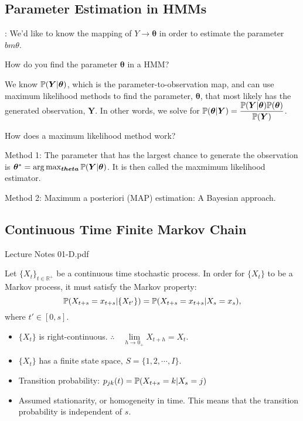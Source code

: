 \subsection{Parameter Estimation in HMMs}: We'd like to know the mapping of $Y \to \bm{\theta}$ in order to estimate the parameter $bm{\theta}$.
\begin{quest}
	\item How do you find the parameter $\bm{\theta}$ in a HMM?
	\begin{ans}
	We know $\mathbb{P}(\bm{Y}|\bm{\theta})$, which is the parameter-to-observation map, and can use maximum likelihood methods to find the parameter, $\bm{\theta}$, that most likely has the generated observation, $\bm{Y}$. In other words, we solve for $\mathbb{P}(\bm{\theta} | \bm{Y}) = \dfrac{\mathbb{P}(\bm{Y} | \bm{\theta}) \mathbb{P}(\bm{\theta}) }{ \mathbb{P}(\bm{Y}) } $.  
	\end{ans}
	
	\item How does a maximum likelihood method work?
	\begin{ans}
	Method 1: The parameter that has the largest chance to generate the observation is $ \bm{\theta}^* = \arg\max_{\bm{theta}} \mathbb{P} (\bm{Y} | \bm{\theta})$. It is then called the maxmimum likelihood estimator.  

	Method 2: Maximum a posteriori (MAP) estimation: A Bayesian approach. 
	\end{ans}
\end{quest}

\subsection{Continuous Time Finite Markov Chain}

Lecture Notes 01-D.pdf 

Let $\{ X_t \}_{t\in\mathbb{R}^+}$ be a continuous time stochastic process. In order for $\{ X_t \}$ to be a Markov process, it must satisfy the Markov property:
\[
	\mathbb{P}(X_{t + s} = x_{t + s} |  \{ X_{t'} \}) 
	= \mathbb{P}(X_{t + s}  = x_{t + s} | X_s = x_s),
\] where $t' \in [0, s]$. 


\begin{itemize}
	\item $\{ X_t \}$ is right-continuous. $\therefore \quad \lim\limits_{h \to 0_+} X_{t + h} = X_t$. 
	\item $\{X_t\}$ has a finite state space, $S = \{1, 2, \cdots, I\}$. 
	\item Transition probability: $p_{jk} (t) = \mathbb{P} (X_{t + s} = k | X_s = j)$
	\item Assumed stationarity, or homogeneity in time. This means that the transition probability is independent of $s$. 
\end{itemize}

